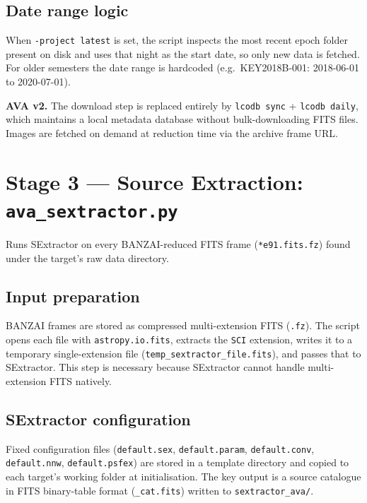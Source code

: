 \documentclass[12pt,a4paper]{article}
\begin{document}
\subsection{Date range logic}

When \texttt{-project latest} is set, the script inspects the most recent epoch folder
present on disk and uses that night as the start date, so only new data is fetched.  For
older semesters the date range is hardcoded (e.g.\ KEY2018B-001: 2018-06-01 to
2020-07-01).

\begin{notebox}
\textbf{AVA v2.}  The download step is replaced entirely by \texttt{lcodb sync} +
\texttt{lcodb daily}, which maintains a local metadata database without bulk-downloading
FITS files.  Images are fetched on demand at reduction time via the archive frame URL.
\end{notebox}

\section{Stage 3 --- Source Extraction: \texttt{ava\_sextractor.py}}
\label{sec:sextractor}

Runs SExtractor on every BANZAI-reduced FITS frame (\texttt{*e91.fits.fz}) found under
the target's raw data directory.

\subsection{Input preparation}

BANZAI frames are stored as compressed multi-extension FITS (\texttt{.fz}).  The script
opens each file with \texttt{astropy.io.fits}, extracts the \texttt{SCI} extension, writes
it to a temporary single-extension file (\texttt{temp\_sextractor\_file.fits}), and passes
that to SExtractor.  This step is necessary because SExtractor cannot handle
multi-extension FITS natively.

\subsection{SExtractor configuration}

Fixed configuration files (\texttt{default.sex}, \texttt{default.param},
\texttt{default.conv}, \texttt{default.nnw}, \texttt{default.psfex}) are stored in a
template directory and copied to each target's working folder at initialisation.  The key
output is a source catalogue in FITS binary-table format (\texttt{\_cat.fits}) written to
\texttt{sextractor\_ava/}.
\end{document}

